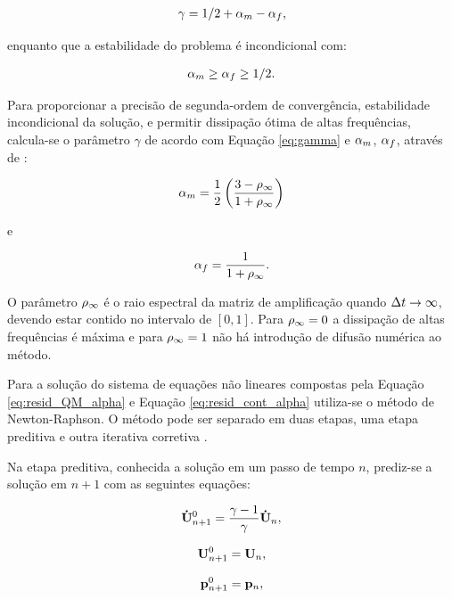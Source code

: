 \begin{gather}
\gamma = 1/2 + \alpha_m - \alpha_f,\label{eq:gamma}
\end{gather}

\noindent enquanto que a estabilidade do problema é incondicional com:

\begin{gather}
\alpha_m \ge \alpha_f \ge 1/2.
\end{gather}

Para proporcionar a precisão de segunda-ordem de convergência, estabilidade incondicional da solução, e permitir dissipação ótima de altas frequências, calcula-se o parâmetro $\gamma$ de acordo com Equação \eqref{eq:gamma} e $\alpha_m$, $\alpha_f$, através de \cite{Hughes:2000}:

\begin{gather}
\alpha_m = \frac{1}{2}\left(\frac{3 - \rho_\infty}{1+\rho_\infty}\right)\label{eq:alpha_m}
\end{gather}

\noindent e

\begin{gather}
\alpha_f = \frac{1}{1+\rho_\infty}\label{eq:alpha_f}.
\end{gather}

O parâmetro $\rho_\infty$ é o raio espectral da matriz de amplificação quando $\Delta t \rightarrow \infty$, devendo estar contido no intervalo de $[0,1]$. Para $\rho_\infty = 0$ a dissipação de altas frequências é máxima e para $\rho_\infty = 1$ não há introdução de difusão numérica ao método.

Para a solução do sistema de equações não lineares compostas pela Equação \eqref{eq:resid_QM_alpha} e Equação \eqref{eq:resid_cont_alpha} utiliza-se o método de Newton-Raphson. O método pode ser separado em duas etapas, uma etapa preditiva e outra iterativa corretiva \cite{BazilevsTT:2013a}.

Na etapa preditiva, conhecida a solução em um passo de tempo $n$, prediz-se a solução em $n+1$ com as seguintes equações:

\begin{align}
\mathbf{\dot{U}}_{n+1}^{0} = \frac{\gamma-1}{\gamma}\mathbf{\dot{U}}_{n} \label{eq:pred_acel},
\end{align}

\begin{align}
\mathbf{U}_{n+1}^{0} = \mathbf{U}_{n}, \label{eq:pred_vel}
\end{align}

\begin{align}
\mathbf{p}_{n+1}^{0} = \mathbf{p}_{n},\label{eq:pred_press}
\end{align}

